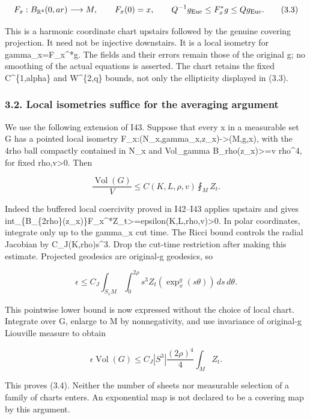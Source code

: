 \documentclass[
  10pt,
]{article}
\begin{document}
\[
 F_x:B_{\mathbb R^4}(0,ar)\longrightarrow M,\qquad F_x(0)=x,
 \qquad Q^{-1}g_{\rm Euc}\le F_x^*g\le Qg_{\rm Euc}. \tag{3.3}
\]

This is a harmonic coordinate chart upstairs followed by the genuine
covering projection. It need not be injective downstairs. It is a local
isometry for gamma\_x=F\_x\^{}*g. The fields and their errors remain
those of the original g; no smoothing of the actual equations is
asserted. The chart retains the fixed C\^{}\{1,alpha\} and W\^{}\{2,q\}
bounds, not only the ellipticity displayed in (3.3).

\hypertarget{local-isometries-suffice-for-the-averaging-argument}{%
\subsubsection{3.2. Local isometries suffice for the averaging
argument}\label{local-isometries-suffice-for-the-averaging-argument}}

We use the following extension of I43. Suppose that every x in a
measurable set G has a pointed local isometry
F\_x:(N\_x,gamma\_x,z\_x)-\textgreater(M,g,x), with the 4rho ball
compactly contained in N\_x and Vol\_gamma B\_rho(z\_x)\textgreater=v
rho\^{}4, for fixed rho,v\textgreater0. Then

\[
 \frac{\operatorname{Vol}(G)}V
               \le C(K,L,\rho,v)\fint_M Z_t.         \tag{3.4}
\]

Indeed the buffered local coercivity proved in I42--I43 applies upstairs
and gives
int\_\{B\_\{2rho\}(z\_x)\}F\_x\^{}*Z\_t\textgreater=epsilon(K,L,rho,v)\textgreater0.
In polar coordinates, integrate only up to the gamma\_x cut time. The
Ricci bound controls the radial Jacobian by C\_J(K,rho)s\^{}3. Drop the
cut-time restriction after making this estimate. Projected geodesics are
original-g geodesics, so

\[
 \epsilon\le C_J\int_{S_xM}\int_0^{2\rho}
           s^3 Z_t(\exp_x^g(s\theta))\,ds\,d\theta.  \tag{3.5}
\]

This pointwise lower bound is now expressed without the choice of local
chart. Integrate over G, enlarge to M by nonnegativity, and use
invariance of original-g Liouville measure to obtain

\[
 \epsilon\operatorname{Vol}(G)
 \le C_J|S^3|\frac{(2\rho)^4}{4}\int_M Z_t.
\]

This proves (3.4). Neither the number of sheets nor measurable selection
of a family of charts enters. An exponential map is not declared to be a
covering map by this argument.
\end{document}
